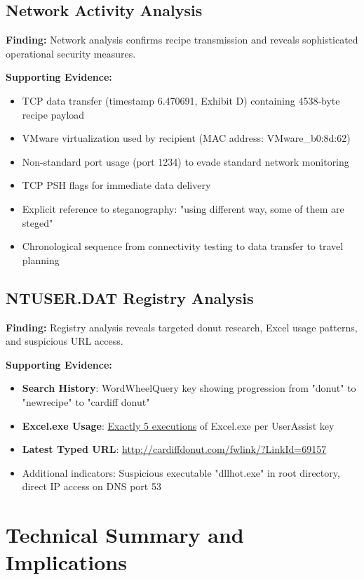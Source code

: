 \subsection{Network Activity Analysis}
\textbf{Finding:} Network analysis confirms recipe transmission and reveals sophisticated operational security measures.

\textbf{Supporting Evidence:}
\begin{itemize}
    \item TCP data transfer (timestamp 6.470691, Exhibit D) containing 4538-byte recipe payload
    \item VMware virtualization used by recipient (MAC address: VMware\_b0:8d:62)
    \item Non-standard port usage (port 1234) to evade standard network monitoring
    \item TCP PSH flags for immediate data delivery
    \item Explicit reference to steganography: "using different way, some of them are steged"
    \item Chronological sequence from connectivity testing to data transfer to travel planning
\end{itemize}

\subsection{NTUSER.DAT Registry Analysis}
\textbf{Finding:} Registry analysis reveals targeted donut research, Excel usage patterns, and suspicious URL access.

\textbf{Supporting Evidence:}
\begin{itemize}
    \item \textbf{Search History}: WordWheelQuery key showing progression from "donut" to "newrecipe" to "cardiff donut"
    \item \textbf{Excel.exe Usage}: \underline{Exactly 5 executions} of Excel.exe per UserAssist key
    \item \textbf{Latest Typed URL}: \url{http://cardiffdonut.com/fwlink/?LinkId=69157}
    \item Additional indicators: Suspicious executable "dllhot.exe" in root directory, direct IP access on DNS port 53
\end{itemize}

\section{Technical Summary and Implications}

